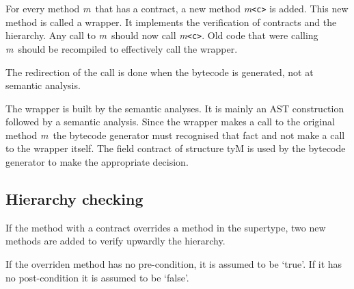 \documentclass{book}
\newcommand{\javaMethod}[1]{{\it #1}}
\begin{document}
For every method \javaMethod{m}\ that has a contract, a new method
\javaMethod{m}\verb+<c>+ is added. This new method is called a
wrapper. It implements the verification of contracts and the
hierarchy. Any call to \javaMethod{m}\ should now call
\javaMethod{m}\verb+<c>+. Old code that were calling \javaMethod{m}\
should be recompiled to effectively call the wrapper.

The redirection of the call is done when the bytecode is generated,
not at semantic analysis.

The wrapper is built by the semantic analyses. It is mainly an AST
construction followed by a semantic analysis.  Since the wrapper makes
a call to the original method \javaMethod{m}\, the bytecode generator
must recognised that fact and not make a call to the wrapper
itself. The field contract of structure tyM is used by the bytecode
generator to make the appropriate decision.

\subsection{Hierarchy checking}

If the method with a contract overrides a method in the supertype, two
new methods are added to verify upwardly the hierarchy.

If the overriden method has no pre-condition, it is assumed to be
`true'. If it has no post-condition it is assumed to be `false'.
\end{document}
